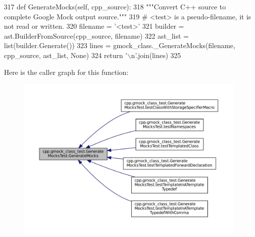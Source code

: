 \begin{DoxyCode}
317   \textcolor{keyword}{def }GenerateMocks(self, cpp\_source):
318     \textcolor{stringliteral}{"""Convert C++ source to complete Google Mock output source."""}
319     \textcolor{comment}{# <test> is a pseudo-filename, it is not read or written.}
320     filename = \textcolor{stringliteral}{'<test>'}
321     builder = ast.BuilderFromSource(cpp\_source, filename)
322     ast\_list = list(builder.Generate())
323     lines = gmock\_class.\_GenerateMocks(filename, cpp\_source, ast\_list, \textcolor{keywordtype}{None})
324     \textcolor{keywordflow}{return} \textcolor{stringliteral}{'\(\backslash\)n'}.join(lines)
325 
\end{DoxyCode}
Here is the caller graph for this function\+:
\nopagebreak
\begin{figure}[H]
\begin{center}
\leavevmode
\includegraphics[width=350pt]{classcpp_1_1gmock__class__test_1_1GenerateMocksTest_afdce6749dca14c1aa90762d389d92c87_icgraph}
\end{center}
\end{figure}
\mbox{\label{classcpp_1_1gmock__class__test_1_1GenerateMocksTest_aba1ab8ae8a897ea9c22a47bcd1524254}} 
